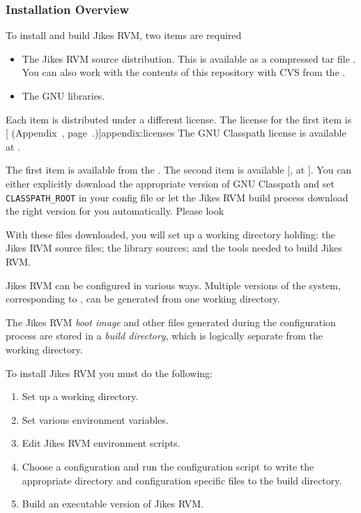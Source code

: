 \subsubsection{Installation Overview}\label{sec:installDetails}

To install and build Jikes\TMweb{} RVM, two items are required
\begin{itemize}
\item The Jikes RVM source distribution.  This is available as a
compressed tar file \texttt{\RVMTarFile}.  You can also work with the
contents of this repository with CVS from the 
.

\item The GNU 
 libraries. 
\end{itemize}

Each item is distributed under a different license.  The license for
the first item is [ (Appendix~\Ref, page~\Pageref.)]{appendix:licenses}
The GNU Classpath license is available at 
\xlink{\texttt{\classpathURL}}{\classpathURL}. 

The first item is available  from the . The second item is
available [, at \texttt{\classpathURL}]{\classpathURL}.
You can either explicitly download the appropriate version of GNU
Classpath and set \texttt{CLASSPATH\_ROOT} in your config file or let
the Jikes RVM build process download the right version for you
automatically.  Please look \AtManualClasspathRootDiscussion{}

With these files downloaded, you will set up 
a working directory holding: the Jikes RVM source files; the 
library sources; and the tools needed to build Jikes RVM.\@ 

%
Jikes RVM can be configured in various ways.  Multiple versions of the system,
corresponding to , can be generated from 
one working directory.   

The Jikes RVM {\em boot image} and other files generated during the 
configuration process
are stored in a {\em build directory},
 which is logically separate from the working directory. 

To install Jikes RVM  you must do the following:
\begin{enumerate}
\item Set up a working directory.
\item Set various environment variables.
\item Edit Jikes RVM environment scripts.
\item Choose a configuration and run the configuration script to write
the appropriate directory and configuration specific files to the
build directory.
\item Build an executable version of Jikes RVM.\@
\end{enumerate}

